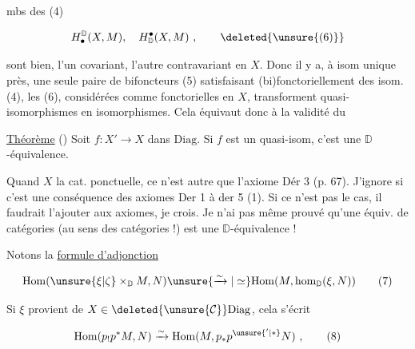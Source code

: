 
 mbs des (4)

\[H^{\mathbb D}_{\bullet}(X,M),\quad H_{\mathbb D}^{\bullet}(X,M)\ ,\tag*{\deleted{\unsure{(6)}}}\]

sont bien, l'un covariant, l'autre contravariant en $X$. Donc il y a, à isom unique près, une seule paire de bifoncteurs (5) satisfaisant (bi)fonctoriellement des isom. (4),  les  (6), considérées comme fonctorielles en $X$, transforment quasi-isomorphismes en isomorphismes. Cela équivaut donc à la validité du

\uline{Théorème} () Soit $f:X'\longrightarrow X$ dans $\mathrm{Diag}$. Si $f$ est un quasi-isom, c'est une $\mathbb D$-équivalence.


Quand $X$  la cat. ponctuelle, ce n'est  autre que l'axiome Dér 3 (p. 67).  J'ignore si c'est une conséquence des axiomes Der 1 à der 5 (1). Si ce n'est pas le cas, il faudrait l'ajouter aux axiomes, je crois. Je n'ai pas même prouvé qu'une équiv. de catégories  (au sens des catégories !) est une $\mathbb D$-équivalence !

Notons la \uline{formule d'adjonction}

\[\mathrm{Hom}(\unsure{\xi|\zeta}\times_{\mathbb D}M,N)\unsure{\xrightarrow{\sim}|\simeq}
\mathrm{Hom}(M,\mathrm{hom}_{\mathbb D}(\xi,N))\tag*{(7)}\]

Si $\xi$ provient  de $X\in\deleted{\unsure{\mathcal C}}\mathrm{Diag}$,  cela s'écrit

\[\mathrm{Hom}(p_!p^*M,N)\xrightarrow{\sim}\mathrm{Hom}(M,p_*p^{\unsure{'|*}}N)\ ,\tag*{(8)}\]

